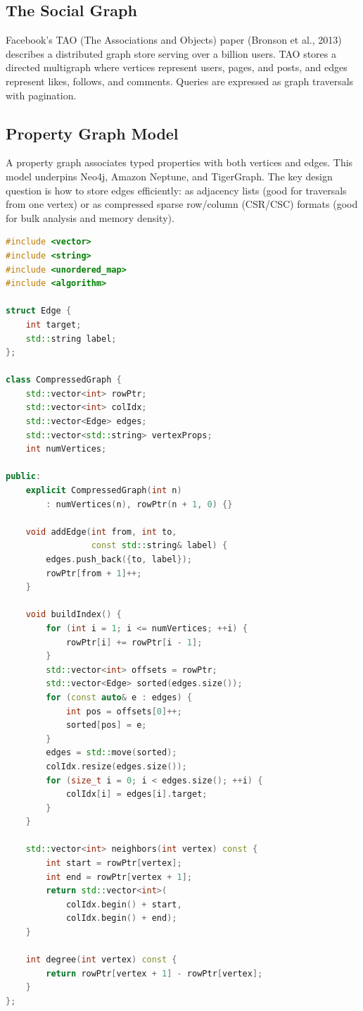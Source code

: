 \subsection{The Social Graph}

Facebook's TAO (The Associations and Objects) paper (Bronson et al., 2013) describes
a distributed graph store serving over a billion users.  TAO stores a directed
multigraph where vertices represent users, pages, and posts, and edges represent
likes, follows, and comments.  Queries are expressed as graph traversals with
pagination.

\subsection{Property Graph Model}

A property graph associates typed properties with both vertices and edges.  This
model underpins Neo4j, Amazon Neptune, and TigerGraph.  The key design question is
how to store edges efficiently: as adjacency lists (good for traversals from one
vertex) or as compressed sparse row/column (CSR/CSC) formats (good for bulk
analysis and memory density).

\begin{lstlisting}[language=C++]
#include <vector>
#include <string>
#include <unordered_map>
#include <algorithm>

struct Edge {
    int target;
    std::string label;
};

class CompressedGraph {
    std::vector<int> rowPtr;
    std::vector<int> colIdx;
    std::vector<Edge> edges;
    std::vector<std::string> vertexProps;
    int numVertices;

public:
    explicit CompressedGraph(int n)
        : numVertices(n), rowPtr(n + 1, 0) {}

    void addEdge(int from, int to,
                 const std::string& label) {
        edges.push_back({to, label});
        rowPtr[from + 1]++;
    }

    void buildIndex() {
        for (int i = 1; i <= numVertices; ++i) {
            rowPtr[i] += rowPtr[i - 1];
        }
        std::vector<int> offsets = rowPtr;
        std::vector<Edge> sorted(edges.size());
        for (const auto& e : edges) {
            int pos = offsets[0]++;
            sorted[pos] = e;
        }
        edges = std::move(sorted);
        colIdx.resize(edges.size());
        for (size_t i = 0; i < edges.size(); ++i) {
            colIdx[i] = edges[i].target;
        }
    }

    std::vector<int> neighbors(int vertex) const {
        int start = rowPtr[vertex];
        int end = rowPtr[vertex + 1];
        return std::vector<int>(
            colIdx.begin() + start,
            colIdx.begin() + end);
    }

    int degree(int vertex) const {
        return rowPtr[vertex + 1] - rowPtr[vertex];
    }
};
\end{lstlisting}


